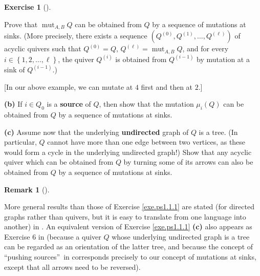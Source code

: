\documentclass[numbers=enddot,12pt,final,onecolumn,notitlepage]{scrartcl}%
\newcounter{exer}
\numberwithin{exer}{section}
\theoremstyle{definition}
\newtheorem{remk}[theo]{Remark}
\newenvironment{remark}[1][]
{\begin{remk}[#1]\begin{leftbar}}
{\end{leftbar}\end{remk}}
\newtheorem{exmp}[exer]{Exercise}
\newenvironment{exercise}[1][]
{\begin{exmp}[#1]\begin{leftbar}}
{\end{leftbar}\end{exmp}}
\begin{document}
\begin{exercise}
Prove that $\operatorname*{mut}\nolimits_{A,B}Q$ can be obtained from $Q$ by a
sequence of mutations at sinks. (More precisely, there exists a sequence
$\left(  Q^{\left(  0\right)  },Q^{\left(  1\right)  },\ldots,Q^{\left(
\ell\right)  }\right)  $ of acyclic quivers such that $Q^{\left(  0\right)
}=Q$, $Q^{\left(  \ell\right)  }=\operatorname*{mut}\nolimits_{A,B}Q$, and for
every $i\in\left\{  1,2,\ldots,\ell\right\}  $, the quiver $Q^{\left(
i\right)  }$ is obtained from $Q^{\left(  i-1\right)  }$ by mutation at a sink
of $Q^{\left(  i-1\right)  }$.)

[In our above example, we can mutate at $4$ first and then at $2$.]

\textbf{(b)} If $i\in Q_{0}$ is a \textbf{source} of $Q$, then show that the
mutation $\mu_{i}\left(  Q\right)  $ can be obtained from $Q$ by a sequence of
mutations at sinks.

\textbf{(c)} Assume now that the underlying \textbf{undirected} graph of $Q$
is a tree. (In particular, $Q$ cannot have more than one edge between two
vertices, as these would form a cycle in the underlying undirected graph!)
Show that any acyclic quiver which can be obtained from $Q$ by turning some of
its arrows can also be obtained from $Q$ by a sequence of mutations at sinks.
\end{exercise}

\begin{remark}
More general results than those of Exercise \ref{exe.ps1.1.1} are stated (for
directed graphs rather than quivers, but it is easy to translate from one
language into another) in \cite{Pretzel}. An equivalent version of Exercise
\ref{exe.ps1.1.1} \textbf{(c)} also appears as Exercise 6 in \cite{mt3}
(because a quiver $Q$ whose underlying undirected graph is a tree can be
regarded as an orientation of the latter tree, and because the concept of
\textquotedblleft pushing sources\textquotedblright\ in \cite{mt3} corresponds
precisely to our concept of mutations at sinks, except that all arrows need to
be reversed).
\end{remark}
\end{document}
